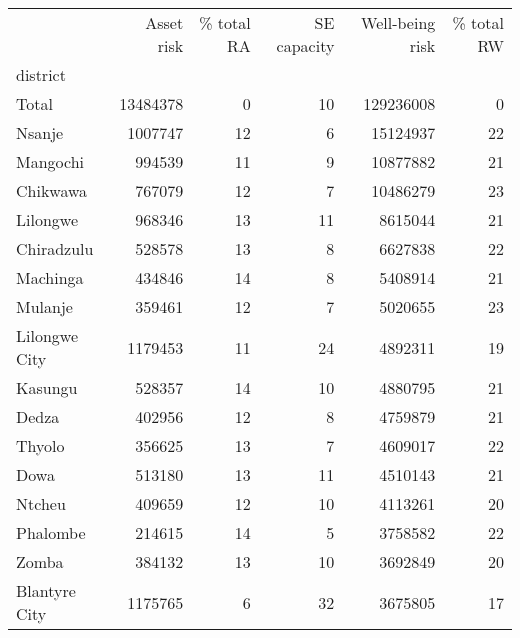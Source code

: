 \begin{tabular}{lrrrrr}
\toprule
{} &  Asset risk &  \% total RA &  SE capacity &  Well-being risk &  \% total RW \\
district      &             &             &              &                  &             \\
\midrule
Total         &    13484378 &           0 &           10 &        129236008 &           0 \\
Nsanje        &     1007747 &          12 &            6 &         15124937 &          22 \\
Mangochi      &      994539 &          11 &            9 &         10877882 &          21 \\
Chikwawa      &      767079 &          12 &            7 &         10486279 &          23 \\
Lilongwe      &      968346 &          13 &           11 &          8615044 &          21 \\
Chiradzulu    &      528578 &          13 &            8 &          6627838 &          22 \\
Machinga      &      434846 &          14 &            8 &          5408914 &          21 \\
Mulanje       &      359461 &          12 &            7 &          5020655 &          23 \\
Lilongwe City &     1179453 &          11 &           24 &          4892311 &          19 \\
Kasungu       &      528357 &          14 &           10 &          4880795 &          21 \\
Dedza         &      402956 &          12 &            8 &          4759879 &          21 \\
Thyolo        &      356625 &          13 &            7 &          4609017 &          22 \\
Dowa          &      513180 &          13 &           11 &          4510143 &          21 \\
Ntcheu        &      409659 &          12 &           10 &          4113261 &          20 \\
Phalombe      &      214615 &          14 &            5 &          3758582 &          22 \\
Zomba         &      384132 &          13 &           10 &          3692849 &          20 \\
Blantyre City &     1175765 &           6 &           32 &          3675805 &          17 \\

\end{tabular}
